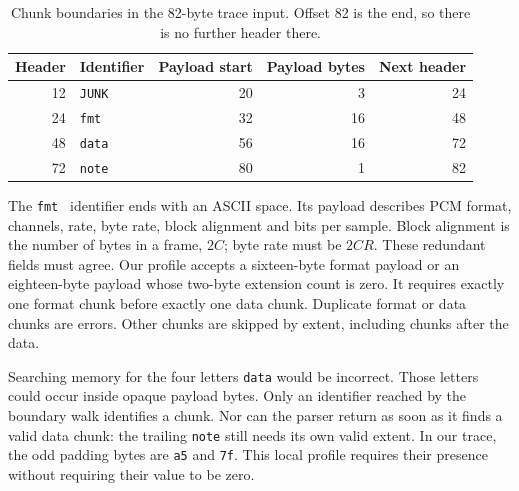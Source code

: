 \begin{table}[!ht]
  \centering
  \begin{tabular}{r l r r r}
    \toprule
    Header & Identifier                    & Payload start & Payload bytes & Next header \\
    \midrule
    12     & \texttt{JUNK}                 & 20            & 3             & 24          \\
    24     & \texttt{fmt\textvisiblespace} & 32            & 16            & 48          \\
    48     & \texttt{data}                 & 56            & 16            & 72          \\
    72     & \texttt{note}                 & 80            & 1             & 82          \\
    \bottomrule
  \end{tabular}
  \caption{Chunk boundaries in the 82-byte trace input. Offset 82 is the end,
    so there is no further header there.}
  \label{revision:wav-chunks}
\end{table}

The \texttt{fmt } identifier ends with an ASCII space. Its payload describes
PCM format, channels, rate, byte rate, block alignment and bits per sample.
Block alignment is the number of bytes in a frame, $2C$; byte rate must be
$2CR$. These redundant fields must agree. Our profile accepts a sixteen-byte
format payload or an eighteen-byte payload whose two-byte extension count is
zero. It requires exactly one format chunk before exactly one data chunk.
Duplicate format or data chunks are errors. Other chunks are skipped by extent,
including chunks after the data.

Searching memory for the four letters \texttt{data} would be incorrect. Those
letters could occur inside opaque payload bytes. Only an identifier reached by
the boundary walk identifies a chunk. Nor can the parser return as soon as it
finds a valid data chunk: the trailing \texttt{note} still needs its own valid
extent. In our trace, the odd padding bytes are \texttt{a5} and \texttt{7f}.
This local profile requires their presence without requiring their value to be
zero.

